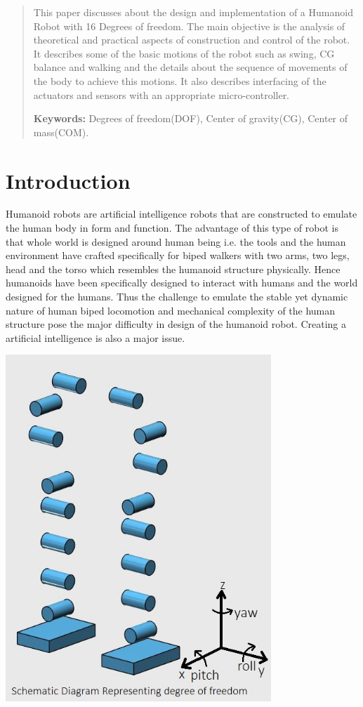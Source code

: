 \documentclass[12pt]{article}
\begin{document}
\tableofcontents
\newpage
\listoffigures
\listoftables	
\newpage
\begin{abstract}
This paper discusses about the design and implementation of a Humanoid Robot with 16 Degrees of freedom. The main objective is the analysis of theoretical and practical aspects of construction and control of the robot. It describes some of the basic motions of the robot such as swing, CG balance and walking and the details about the sequence of movements of the body to achieve this motions. It also describes interfacing of the actuators and sensors with an appropriate micro-controller.


\textbf{Keywords:} Degrees of freedom(DOF), Center of gravity(CG), Center of mass(COM).
\end{abstract}




\section{Introduction}
Humanoid robots are artificial intelligence robots that are constructed to emulate the
human body in form and function. The advantage of this type of robot is that whole world
is designed around human being i.e. the tools and the human environment have crafted
specifically for biped walkers with two arms, two legs, head and the torso which resembles
the humanoid structure physically. Hence humanoids have been specifically designed to
interact with humans and the world designed for the humans. Thus the challenge to
emulate the stable yet dynamic nature of human biped locomotion and mechanical
complexity of the human structure pose the major difficulty in design of the humanoid
robot. Creating a artificial intelligence is also a major issue.\\
\begin{center}
\includegraphics[width=10cm]{Schematic.jpg}\\
\end{center}
\end{document}

